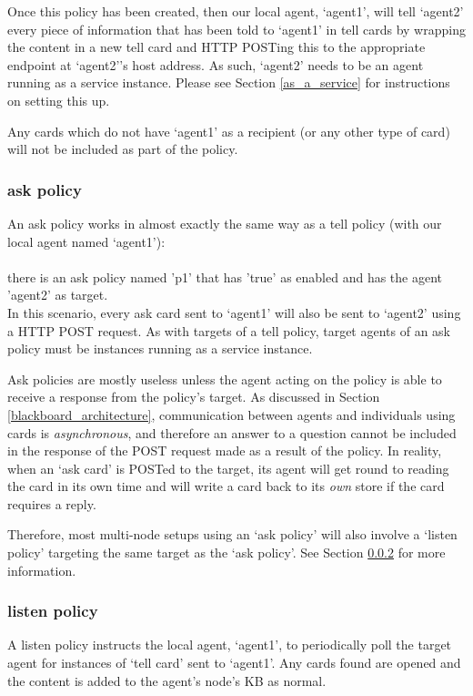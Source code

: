 \documentclass{scrartcl}
\newcommand{\ce}[1]{\textsf{#1}}
\begin{document}
Once this policy has been created, then our local agent, `agent1', will tell `agent2' every piece of information that has been told to `agent1' in tell cards by wrapping the content in a new tell card and HTTP POSTing this to the appropriate endpoint at `agent2''s host address. As such, `agent2' needs to be an agent running as a service instance. Please see Section \ref{as_a_service} for instructions on setting this up.

Any cards which do not have `agent1' as a recipient (or any other type of card) will not be included as part of the policy.

\subsubsection{\ce{ask policy}}
An \ce{ask policy} works in almost exactly the same way as a tell policy (with our local agent named `agent1'):\\
\\\ce{there is an ask policy named 'p1' that has 'true' as enabled and has the agent 'agent2' as target.}\\

In this scenario, every \ce{ask card} sent to `agent1' will also be sent to `agent2' using a HTTP POST request. As with targets of a \ce{tell policy}, target agents of an \ce{ask policy} must be instances running as a service instance.

Ask policies are mostly useless unless the agent acting on the policy is able to receive a response from the policy's target. As discussed in Section \ref{blackboard_architecture}, communication between agents and individuals using cards is \textit{asynchronous}, and therefore an answer to a question cannot be included in the response of the POST request made as a result of the policy. In reality, when an `ask card' is POSTed to the target, its agent will get round to reading the card in its own time and will write a card back to its \textit{own} store if the card requires a reply.

Therefore, most multi-node setups using an `ask policy' will also involve a `listen policy' targeting the same target as the `ask policy'. See Section \ref{listen_policy} for more information.

\subsubsection{\ce{listen policy}}
\label{listen_policy}
A \ce{listen policy} instructs the local agent, `agent1', to periodically poll the target agent for instances of `tell card' sent to `agent1'. Any cards found are opened and the content is added to the agent's node's KB as normal.\\
\end{document}

